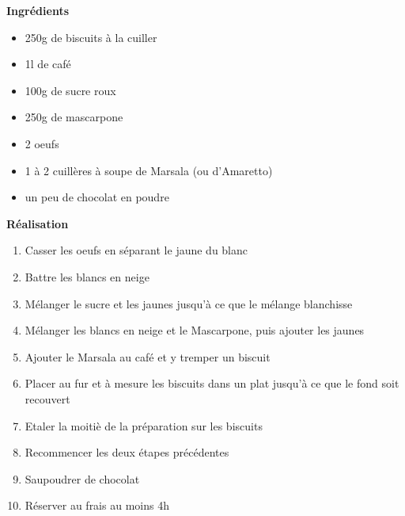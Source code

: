\documentclass[a4paper]{report}
\begin{document}

\flushleft
\textbf{\Large{Ingrédients}}
\begin{itemize}
  \item 250g de biscuits à la cuiller
  \item 1l de café
  \item 100g de sucre roux
  \item 250g de mascarpone
  \item 2 oeufs
  \item 1 à 2 cuillères à soupe de Marsala (ou d’Amaretto)
  \item un peu de chocolat en poudre
\end{itemize}



\textbf{\Large{Réalisation}}
\begin{enumerate}
\item Casser les oeufs en séparant le jaune du blanc
  \item Battre les blancs en neige
  \item Mélanger le sucre et les jaunes jusqu’à ce que le mélange blanchisse
  \item Mélanger les blancs en neige et le Mascarpone, puis ajouter les jaunes
  \item Ajouter le Marsala au café et y tremper un biscuit
  \item Placer au fur et à mesure les biscuits dans un plat jusqu’à ce que le fond soit recouvert
  \item Etaler la moitiè de la préparation sur les biscuits
  \item Recommencer les deux étapes précédentes
  \item Saupoudrer de chocolat
  \item  Réserver au frais au moins 4h
\end{enumerate}
\end{document}
